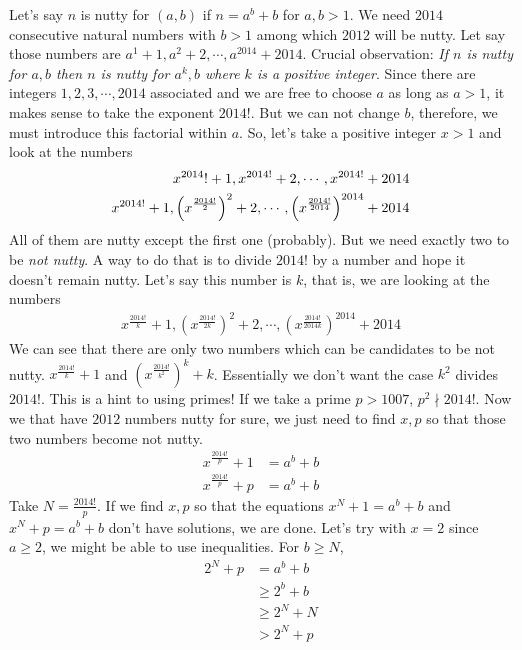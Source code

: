 \begin{solution}
	Let's say $n$ is nutty for $(a,b)$ if $n=a^b+b$ for $a,b>1$. We need $2014$ consecutive natural numbers with $b>1$ among which $2012$ will be nutty. Let say those numbers are $a^1+1,a^2+2,\cdots,a^{2014}+2014$. Crucial observation: \textit{If $n$ is nutty for $a,b$ then $n$ is nutty for $a^k,b$ where $k$ is a positive integer}. Since there are integers $1,2,3,\cdots,2014$ associated and we are free to choose $a $ as long as $a>1$, it makes sense to take the exponent $2014!$. But we can not change $b$, therefore, we must introduce this factorial within $a$. So, let's take a positive integer $x>1$ and look at the numbers
		\begin{align*}
			x^{2014}!+1,x^{2014!}+2,\cdots,x^{2014!}+2014\\
			x^{2014!}+1,\left(x^{\frac{2014!}{2}}\right)^2+2,\cdots,\left(x^{\frac{2014!}{2014}}\right)^{2014}+2014
		\end{align*}
	All of them are nutty except the first one (probably). But we need exactly two to be \textit{not nutty}. A way to do that is to divide $2014!$ by a number and hope it doesn't remain nutty. Let's say this number is $k$, that is, we are looking at the numbers
		\begin{align*}
			x^{\frac{2014!}{k}}+1,\left(x^{\frac{2014!}{2k}}\right)^2+2,\cdots,\left(x^{\frac{2014!}{2014k}}\right)^{2014}+2014
		\end{align*}
	We can see that there are only two numbers which can be candidates to be not nutty. $x^{\frac{2014!}{k}}+1$ and $\left(x^{\frac{2014!}{k^2}}\right)^k+k$. Essentially we don't want the case $k^2$ divides $2014!$. This is a hint to using primes! If we take a prime $p>1007$, $p^2\nmid2014!$. Now we that have $2012$ numbers nutty for sure, we just need to find $x,p$ so that those two numbers become not nutty.
		\begin{align*}
			x^{\frac{2014!}{p}}+1 & = a^b+b\\
			x^{\frac{2014!}{p}}+p & = a^b+b
		\end{align*}
	Take $N = \frac{2014!}{p}$. If we find $x,p$ so that the equations $x^N+1=a^b+b$ and $x^N+p = a^b+b$ don't have solutions, we are done. Let's try with $x=2$ since $a\geq2$, we might be able to use inequalities. For $b\geq N$,
		\begin{align*}
			2^N+p & = a^b+b\\
		  &\geq2^b+b\\
		  &\geq2^N+N\\
		  & > 2^N+p
		\end{align*}

\end{solution}
